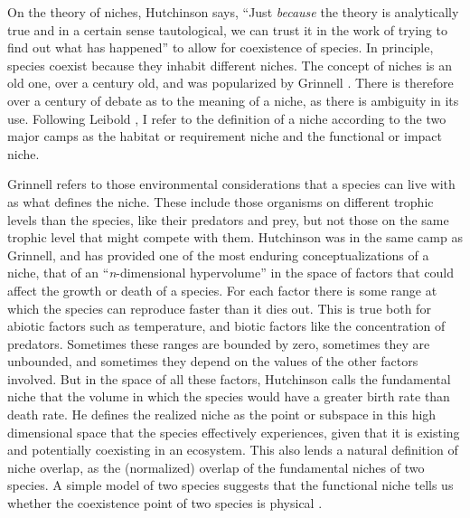 On the theory of niches, Hutchinson \cite{Hutchinson1957} says, ``Just \emph{because} the theory is analytically true and in a certain sense tautological, we can trust it in the work of trying to find out what has happened'' to allow for coexistence of species. 
In principle, species coexist because they inhabit different niches. 
The concept of niches is an old one, over a century old, and was popularized by Grinnell \cite{Grinnell1917}. 
There is therefore over a century of debate as to the meaning of a niche, as there is ambiguity in its use. 
Following Leibold \cite{Leibold1995}, I refer to the definition of a niche according to the two major camps as the habitat or requirement niche and the functional or impact niche. 

Grinnell \cite{Grinnell1917} refers to those environmental considerations that a species can live with as what defines the niche. 
These include those organisms on different trophic levels than the species, like their predators and prey, but not those on the same trophic level that might compete with them. 
Hutchinson \cite{Hutchinson1957} was in the same camp as Grinnell, and has provided one of the most enduring conceptualizations of a niche, that of an ``\emph{n}-dimensional hypervolume'' in the space of factors that could affect the growth or death of a species. 
For each factor there is some range at which the species can reproduce faster than it dies out. 
This is true both for abiotic factors such as temperature, and biotic factors like the concentration of predators. 
Sometimes these ranges are bounded by zero, sometimes they are unbounded, and sometimes they depend on the values of the other factors involved. 
But in the space of all these factors, Hutchinson calls the fundamental niche that the volume in which the species would have a greater birth rate than death rate. 
He defines the realized niche as the point or subspace in this high dimensional space that the species effectively experiences, given that it is existing and potentially coexisting in an ecosystem. 
This also lends a natural definition of niche overlap, as the (normalized) overlap of the fundamental niches of two species. 
A simple model of two species suggests that the functional niche tells us whether the coexistence point of two species is physical \cite{checkit}. 

